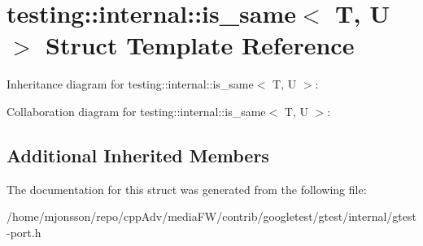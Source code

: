 \hypertarget{structtesting_1_1internal_1_1is__same}{}\section{testing\+:\+:internal\+:\+:is\+\_\+same$<$ T, U $>$ Struct Template Reference}
\label{structtesting_1_1internal_1_1is__same}


Inheritance diagram for testing\+:\+:internal\+:\+:is\+\_\+same$<$ T, U $>$\+:


Collaboration diagram for testing\+:\+:internal\+:\+:is\+\_\+same$<$ T, U $>$\+:
\subsection*{Additional Inherited Members}


The documentation for this struct was generated from the following file\+:\begin{DoxyCompactItemize}
\item 
/home/mjonsson/repo/cpp\+Adv/media\+F\+W/contrib/googletest/gtest/internal/gtest-\/port.\+h\end{DoxyCompactItemize}
